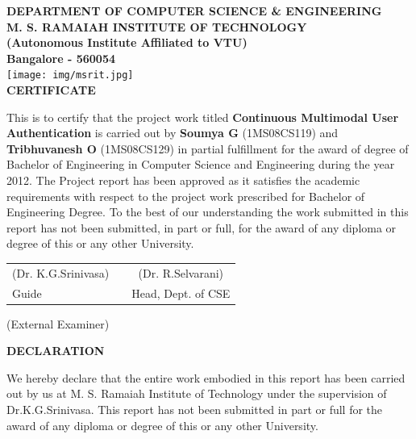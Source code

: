 \documentclass[12pt]{report}			%
\begin{document}
\newpage
%
%
\begin{center}
\uppercase{\textbf{Department of Computer Science \& Engineering}}\\[2ex]
\uppercase{\textbf{M. S. Ramaiah Institute of Technology}}\\
\textbf{(Autonomous Institute Affiliated to VTU)}\\
\textbf{Bangalore - 560054}\\[2ex]
\texttt{[image: img/msrit.jpg]}\\[10ex]
\uppercase{\textbf{\large Certificate}}\\[4ex]
\end{center}
This is to certify that the project work titled
\textbf{Continuous Multimodal User Authentication}
is carried out by
\textbf{Soumya G} (1MS08CS119) and
\textbf{Tribhuvanesh O} (1MS08CS129)
in partial fulfillment for the award of degree of Bachelor of
Engineering in Computer Science and Engineering during the year 2012. The Project
report has been approved as it satisfies the academic requirements with respect to
the project work prescribed for Bachelor of Engineering Degree. To the best of our
understanding the work submitted in this report has not been submitted, in part or full, for
the award of any diploma or degree of this or any other University.\\[5ex]
\begin{center}
\begin{table}[htp]
	\centering
	\begin{tabular}{lcc}
	(Dr. K.G.Srinivasa)       &  \hspace{90 mm} & (Dr. R.Selvarani)             \\
	Guide                     &  \hspace{90 mm} & Head, Dept. of CSE             \\ 
	\end{tabular}
\end{table}

\vspace{6 mm}
(External Examiner)
\end{center}

\newpage
\begin{center}
\uppercase{\textbf{\large Declaration}}
\end{center}
We hereby declare that the entire work embodied in this report has been carried out by
us at M. S. Ramaiah Institute of Technology under the supervision of
Dr.K.G.Srinivasa.
This report has not been submitted in part or full for the award of any
diploma or degree of this or any other University.
\end{document}
